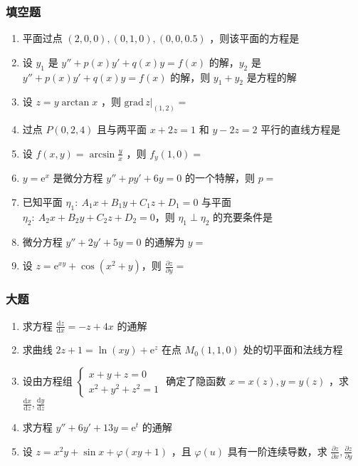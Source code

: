 \documentclass[cn,11pt,fancy,hide]{elegantbook}
\newcommand{\ee}{\mathrm{e}}
\newcommand{\dd}{\mathrm{d}}
\begin{document}
\subsubsection{填空题}
\begin{enumerate}[leftmargin=0pt]
	\item 平面过点 $(2,0,0),(0,1,0),(0,0,0.5)$ ，则该平面的方程是\underline{\hspace{3cm}}
	\item 设 $y_1$ 是 $y''+p(x)y'+q(x)y=f(x)$ 的解，$y_2$ 是 $y''+p(x)y'+q(x)y=f(x)$ 的解，则 $y_1+y_2$ 是\underline{\hspace{3cm}}方程的解
	\item 设 $z=y\arctan x$ ，则 $\left.\mathrm{grad}\,z\right|_{(1,2)}=$\underline{\hspace{3cm}}
	\item 过点 $P(0,2,4)$ 且与两平面 $x+2z=1$ 和 $y-2z=2$ 平行的直线方程是\underline{\hspace{3cm}}
	\item 设 $f(x,y)=\arcsin\frac{y}{x}$ ，则 $f_y(1,0)=$\underline{\hspace{3cm}}
	\item $y=\ee^x$ 是微分方程 $y''+py'+6y=0$ 的一个特解，则 $p=$\underline{\hspace{3cm}}
	\item 已知平面 $\eta_1:\ A_1x+B_1y+C_1z+D_1=0$ 与平面 $\eta_2:\ A_2x+B_2y+C_2z+D_2=0$，则 $\eta_1\perp\eta_2$ 的充要条件是\underline{\hspace{3cm}}
	\item 微分方程 $y''+2y'+5y=0$ 的通解为 $y=$\underline{\hspace{3cm}}
	\item 设 $z=\ee^{xy}+\cos\left(x^2+y\right)$，则 $\frac{\partial z}{\partial y}=$\underline{\hspace{3cm}}
\end{enumerate}
\subsubsection{大题}
\begin{enumerate}[leftmargin=0pt]
	\item 求方程 $\frac{\dd z}{\dd x}=-z+4x$ 的通解
	\item 求曲线 $2z+1=\ln(xy)+\ee^z$ 在点 $M_{0}(1,1,0)$ 处的切平面和法线方程
	\item 设由方程组 $\begin{cases}
	x+y+z=0\\
	x^2+y^2+z^2=1
	\end{cases}$
	确定了隐函数 $x=x(z),y=y(z)$ ，求 $\frac{\dd x}{\dd z},\frac{\dd y}{\dd z}$
	\item 求方程 $y''+6y'+13y=\ee^t$ 的通解
	\item 设 $z=x^2y+\sin x+\varphi(xy+1)$ ，且 $\varphi(u)$ 具有一阶连续导数，求 $\frac{\partial z}{\partial x},\frac{\partial z}{\partial y}$
\end{enumerate}
\end{document}
